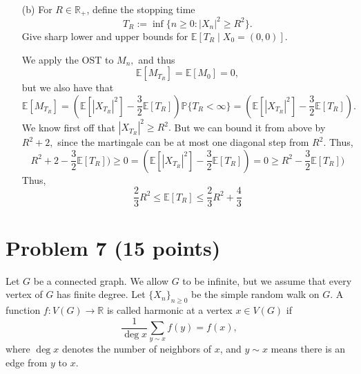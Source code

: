 \documentclass[11pt]{article}
\newcommand{\bbE}{\mathbb{E}}
\newcommand{\bbP}{\mathbb{P}}
\begin{document}
\begin{itemize}
    
    \item[(b)] For \(R \in \mathbb{R}_+\), define the stopping time
    \[
    T_R := \inf\{n \geq 0 : |X_n|^2 \geq R^2\}.
    \]
    Give sharp lower and upper bounds for \(\mathbb{E}[T_R \mid X_0 = (0, 0)]\).
\begin{solution}
    We apply the OST to $M_n,$ and thus 
    \[\bbE[M_{T_R}] = \bbE[M_0] = 0,\] but we also have that 
    \[\bbE[M_{T_R}] = (\bbE[|X_{T_R}|^2]-\frac{3}{2}\bbE[T_R])\bbP\{T_R < \infty\} = (\bbE[|X_{T_R}|^2]-\frac{3}{2}\bbE[T_R]).\] We know first off that $|X_{T_R}|^2 \geq R^2.$ But we can bound it from above by $R^2 + 2,$ since the martingale can be at most one diagonal step from $R^2.$ Thus, 
    \[R^2 + 2 - \frac{3}{2}\bbE[T_R]) \geq 0 = (\bbE[|X_{T_R}|^2]-\frac{3}{2}\bbE[T_R])  = 0\geq R^2 - \frac{3}{2}\bbE[T_R])\] Thus, 
    \[\frac{2}{3}R^2 \leq \bbE[T_R] \leq \frac{2}{3}R^2 + \frac{4}{3}\]
\end{solution}
\end{itemize}

\newpage

\section*{Problem 7 (15 points)}
Let \(G\) be a connected graph. We allow \(G\) to be infinite, but we assume that every vertex of \(G\) has finite degree. Let \(\{X_n\}_{n \geq 0}\) be the simple random walk on \(G\). A function \(f : V(G) \to \mathbb{R}\) is called harmonic at a vertex \(x \in V(G)\) if
\[
\frac{1}{\deg x} \sum_{y \sim x} f(y) = f(x),
\]
where \(\deg x\) denotes the number of neighbors of \(x\), and \(y \sim x\) means there is an edge from \(y\) to \(x\).
\end{document}
